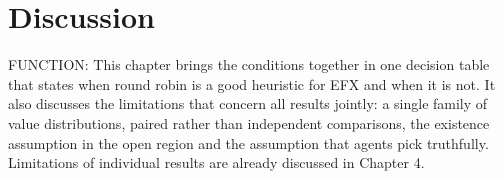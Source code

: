 \chapter{Discussion}\label{ch:discussion}

FUNCTION: This chapter brings the conditions together in one decision table that states when
round robin is a good heuristic for EFX and when it is not. It also discusses the limitations
that concern all results jointly: a single family of value distributions, paired rather than
independent comparisons, the existence assumption in the open region and the assumption that
agents pick truthfully. Limitations of individual results are already discussed in Chapter 4.

